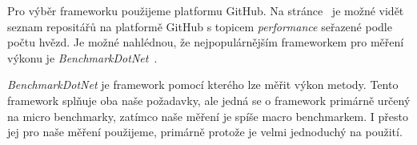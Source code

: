 Pro výběr frameworku použijeme platformu GitHub. Na stránce~\cite{github_performance} je možné vidět seznam repositářů na platformě GitHub s topicem \textit{performance} seřazené podle počtu hvězd. Je možné nahlédnou, že nejpopulárnějším frameworkem pro měření výkonu je \textit{BenchmarkDotNet}~\cite{BenchmarkDotNet}.

\textit{BenchmarkDotNet} je framework pomocí kterého lze měřit výkon metody. Tento framework splňuje oba naše požadavky, ale jedná se o framework primárně určený na micro benchmarky, zatímco naše měření je spíše macro benchmarkem. I přesto jej pro naše měření použijeme, primárně protože je velmi jednoduchý na použití.























